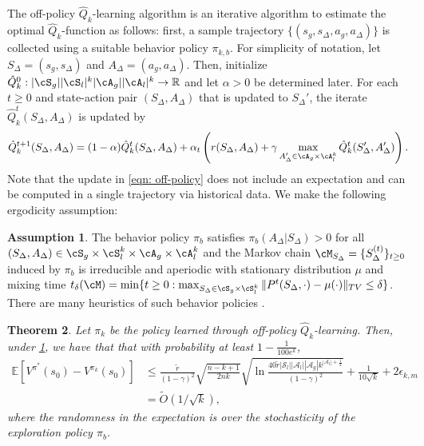 \documentclass{article}
\newcommand\R{\mathbb{R}}
\theoremstyle{plain}
\newtheorem{theorem}{Theorem}[section]
\theoremstyle{definition}
\newtheorem{assumption}[theorem]{Assumption}
\def\E{\mathbb{E}}
\begin{document}
The off-policy $\hat{Q}_k$-learning algorithm is an iterative algorithm to estimate the optimal $\hat{Q}_k$-function as follows: first, a sample trajectory $\{(s_g,s_\Delta,a_g,a_\Delta)\}$ is collected using a suitable behavior policy $\pi_{k,b}$. For simplicity of notation, let $S_\Delta = (s_g,s_\Delta)$ and $A_\Delta=(a_g,a_\Delta)$. Then, initialize $\hat{Q}_k^{0}: {|\cS_g||\cS_l|^k|\cA_g||\cA_l|^k}\to\R$ and let $\alpha>0$ be determined later. For each $t\geq 0$ and state-action pair $(S_\Delta,A_\Delta)$ that is updated to $S_\Delta'$, the iterate $\hat{Q}_k^{t}(S_\Delta,A_\Delta)$ is updated by
\begin{equation}\label{eqn: off-policy}\hat{Q}_k^{t+1}(S_\Delta,A_\Delta) = (1-\alpha) \hat{Q}_k^{t}(S_\Delta,A_\Delta) + \alpha_t \left(r(S_\Delta,A_\Delta) + \gamma \max_{A_\Delta' \in \cA_g\times\cA_l^k} \hat{Q}_k^{t} (S_\Delta',A_\Delta') \right).\end{equation}
Note that the update in \cref{eqn: off-policy} does not include an expectation and can be computed in a single trajectory via historical data. We make the following ergodicity assumption:\\

\begin{assumption}\label{assumption: ergodic}
    The behavior policy $\pi_b$ satisfies $\pi_b(A_\Delta|S_\Delta)>0$ for all $(S_\Delta,A_\Delta)\in \cS_g\times\cS_l^k\times\cA_g\times\cA_l^k$ and the Markov chain $\cM_{S_\Delta} = \{S_\Delta^{(t)}\}_{t\geq 0}$ induced by $\pi_b$ is irreducible and aperiodic with stationary distribution $\mu$ and mixing time $t_\delta(\cM) = \min \{t\geq 0: \max_{S_\Delta \in \cS_g\times\cS_l^k} \|P^t(S_\Delta,\cdot) - \mu(\cdot)\|_{TV} \leq \delta\}$. There are many heuristics of such behavior policies \citep{fujimoto2019off}.
\end{assumption}

\begin{theorem}
    Let $\pi_k$ be the policy learned through off-policy $\hat{Q}_k$-learning. Then, under \cref{assumption: ergodic}, we have that that with probability at least $1 - \frac{1}{100e^k}$,
\begin{align*}\E[V^{\pi^*}(s_0) - V^{\pi_{k}}(s_0)] &\leq \frac{\tilde{r}}{(1-\gamma)^2}\sqrt{\frac{n-k+1}{2nk}} \sqrt{\ln\frac{40\tilde{r}|\mathcal{S}_l||\mathcal{A}_l||\mathcal{A}_g|k^{|\mathcal{A}_l|+\frac{1}{2}}}{(1-\gamma)^2}}  + \frac{1}{10\sqrt{k}} + 2\epsilon_{k,m} \\
&= \tilde{O}(1/\sqrt{k}),\end{align*}
where the randomness in the expectation is over the stochasticity of the exploration policy $\pi_b$.\\
\end{theorem}
\end{document}

